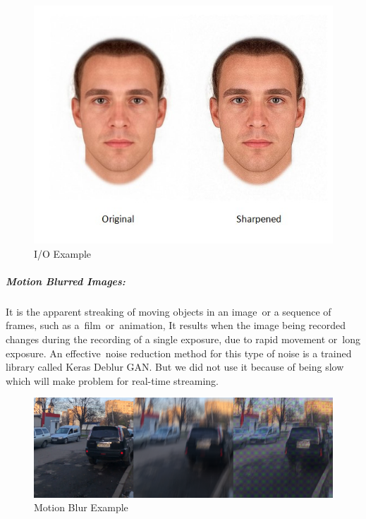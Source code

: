 \begin{figure}[H]
	\centering
	\includegraphics[width=\linewidth]{images/Sharpened.jpg}
	\caption{I/O Example}
\end{figure}

\subparagraph{Motion Blurred Images:}
It is the apparent streaking of moving objects in an image or a sequence of frames, such as a film or animation, It results when the image being recorded changes during the recording of a single exposure, due to rapid movement or long exposure.\newline
An effective noise reduction method for this type of noise is a trained library called Keras Deblur GAN.\newline
But we did not use it because of being slow which will make problem for real-time streaming.
\begin{figure}[H]
	\centering
	\includegraphics[width=\linewidth]{images/motion_blur.png}
	\caption{Motion Blur Example}
\end{figure}

